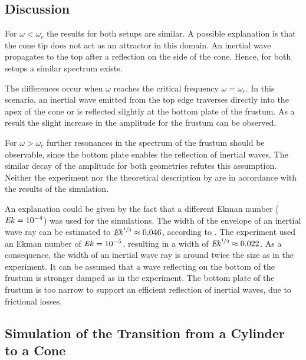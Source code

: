 \subsection{Discussion}
\label{cone:discussion_experiment}

For $\omega < \omega_c$ the results for both setups are similar.
A possible explanation is that the cone tip does not act as an attractor in this domain.
An inertial wave propagates to the top after a reflection on the side of the cone.
Hence, for both setups a similar spectrum exists.

The differences occur when $\omega$ reaches the critical frequency $\omega = \omega_c$. In this scenario, an inertial wave emitted from the
top edge traverses directly into the apex of the cone or is reflected slightly at the bottom plate of the frustum.
As a result the slight increase in the amplitude for the frustum can be observed.

For $\omega > \omega_c$ further resonances in the spectrum of the frustum should be observable,
since the bottom plate enables the reflection of inertial waves.
The similar decay of the amplitude for both geometries refutes this assumption.
Neither the experiment \citep{Beardsley1970} nor the theoretical description by \citep{Greenspan1990}
are in accordance with the results of the simulation.

An explanation could be given by the fact that a different Ekman number ($\mbox{\textit{Ek}} = 10^{-4}$) was used for the simulations.
The width of the envelope of an inertial wave ray can be estimated to $\mbox{\textit{Ek}}^{\nicefrac{1}{3}}\approx 0.046$, according to \citep{Tilgner2000}.
The experiment used an Ekman number of $\mbox{\textit{Ek}} = 10^{-5}$, resulting in a  width of $\mbox{\textit{Ek}}^{\nicefrac{1}{3}}\approx 0.022$.
As a consequence, the width of an inertial wave ray is around twice the size as in the experiment.
It can be assumed that a wave reflecting on the bottom of the frustum
is stronger damped as in the experiment.
The bottom plate of the frustum is too narrow to support an efficient reflection
of inertial waves, due to frictional losses.\\

\subsection{Simulation of the Transition from a Cylinder to a Cone}

